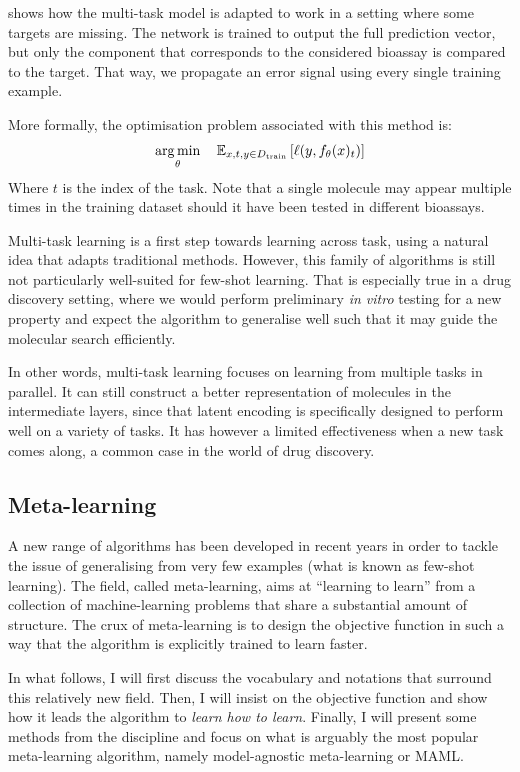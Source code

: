 \documentclass[11pt]{article}
\numberwithin{equation}{subsection}
\begin{document}
 shows how the multi-task model is adapted to work in a setting where some targets are missing. The network is trained to output the full prediction vector, but only the component that corresponds to the considered bioassay is compared to the target. That way, we propagate an error signal using every single training example.

More formally, the optimisation problem associated with this method is:
\begin{equation}
  \label{eq:multitask}
  \operatorname*{arg\,min}_\theta \quad \mathbb{E}_{x, t, y \in {D_{\mathrm{train}}}} \left[ \ell (y, f_\theta(x)_t) \right]
\end{equation}
Where $t$ is the index of the task. Note that a single molecule may appear multiple times in the training dataset should it have been tested in different bioassays.

Multi-task learning is a first step towards learning across task, using a natural idea that adapts traditional methods. However, this family of algorithms is still not particularly well-suited for few-shot learning. That is especially true in a drug discovery setting, where we would perform preliminary \textit{in vitro} testing for a new property and expect the algorithm to generalise well such that it may guide the molecular search efficiently.

In other words, multi-task learning focuses on learning from multiple tasks in parallel. It can still construct a better representation of molecules in the intermediate layers, since that latent encoding is specifically designed to perform well on a variety of tasks. It has however a limited effectiveness when a new task comes along, a common case in the world of drug discovery.


\subsection{Meta-learning}

A new range of algorithms has been developed in recent years in order to tackle the issue of generalising from very few examples (what is known as few-shot learning). The field, called meta-learning, aims at ``learning to learn'' from a collection of machine-learning problems that share a substantial amount of structure.
The crux of meta-learning is to design the objective function in such a way that the algorithm is explicitly trained to learn faster.

In what follows, I will first discuss the vocabulary and notations that surround this relatively new field. Then, I will insist on the objective function and show how it leads the algorithm to \textit{learn how to learn}. Finally, I will present some methods from the discipline and focus on what is arguably the most popular meta-learning algorithm, namely model-agnostic meta-learning or MAML.
\end{document}
